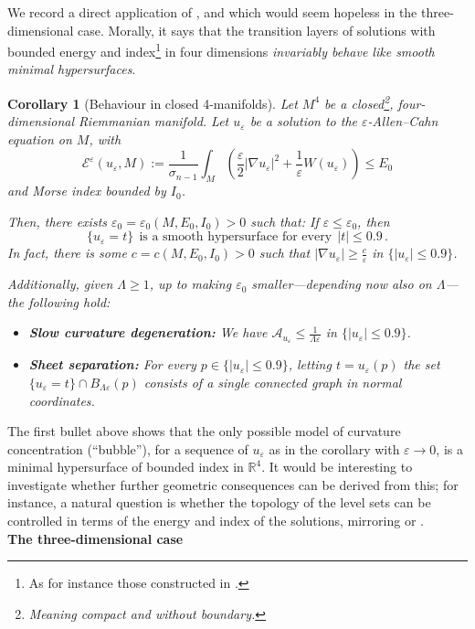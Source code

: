 \documentclass{article}
\newcommand{\R}{\mathbb{R}}
\newcommand{\ep}{\varepsilon}
\newtheorem{corollary}[theorem]{Corollary}
\theoremstyle{definition}
\begin{document}
We record a direct application of , and which would seem hopeless in the three-dimensional case. Morally, it says that the transition layers of solutions with bounded energy and index\footnote{As for instance those constructed in \cite{Guaraco2018,GasparGuaraco2018}.} in four dimensions \textit{invariably behave like smooth minimal hypersurfaces}.
\begin{corollary}[Behaviour in closed 4-manifolds]\label{thm:4closedbeh}
    Let $M^4$ be a closed\footnote{Meaning compact and without boundary.}, four-dimensional Riemmanian manifold. Let $u_{\ep}$ be a solution to the $\ep$-Allen--Cahn equation on $M$, with 
    $$\mathcal E^{\ep}(u_{\ep},M):= \frac{1}{\sigma_{n-1}}\int_{M} \left( \frac{\ep}{2}|\nabla u_\ep|^2 + \frac{1}{\ep} W(u_\ep) \right) \leq E_0$$
    and Morse index bounded by $I_0$.
    
    Then, there exists $\ep_0=\ep_0(M,E_0,I_0)>0$ such that: If $\ep\leq \ep_0$, then
    $$\{u_{\ep}=t\}\ \ \mbox{is a smooth hypersurface for every}\ \ |t|\leq 0.9\,.$$
    In fact, there is some $c=c(M,E_0,I_0)>0$ such that $|\nabla u_{\ep}|\geq \frac{c}{\ep}$ in $\{|u_{\ep}|\leq 0.9\}$.

    Additionally, given $\Lambda\geq 1$, up to making $\ep_0$ smaller---depending now also on $\Lambda$---the following hold:
    \begin{itemize}
        \item {\bf Slow curvature degeneration:} We have $\mathcal A_{u_{\ep}}\leq \frac{1}{\Lambda\ep}$ in $\{|u_{\ep}|\leq 0.9\}$.
        \item {\bf Sheet separation:} For every $p\in \{|u_{\ep}|\leq 0.9\}$, letting $t=u_{\ep}(p)$ the set $\{u_{\ep}=t\}\cap B_{\Lambda\ep}(p)$ consists of a single connected graph in normal coordinates.
    \end{itemize}
\end{corollary}
The first bullet above shows that the only possible model of curvature concentration (``bubble''), for a sequence of $u_\ep$ as in the corollary with $\ep\to 0$, is a minimal hypersurface of bounded index in $\R^4$.
It would be interesting to investigate whether further geometric consequences can be derived from this; for instance, a natural question is whether the topology of the level sets can be controlled in terms of the energy and index of the solutions, mirroring \cite{CKM17} or \cite{BS18}.\\

{\bf The three-dimensional case}
\end{document}
